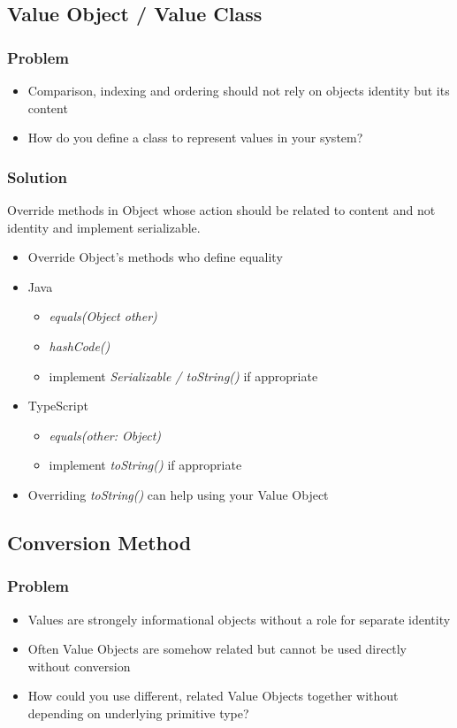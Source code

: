 \subsection{Value Object / Value Class}
\subsubsection{Problem}
\begin{itemize}
    \item Comparison, indexing and ordering should not rely on objects identity but its content
    \item How do you define a class to represent values in your system?
\end{itemize}
\subsubsection{Solution}
Override methods in Object whose action should be related to content and not identity and implement serializable.\\
\begin{itemize}
    \item Override Object's methods who define equality
    \item Java
    \begin{itemize}
        \item \textit{equals(Object other)}
        \item \textit{hashCode()}
        \item implement \textit{Serializable / toString()} if appropriate
    \end{itemize}
    \item TypeScript
    \begin{itemize}
        \item \textit{equals(other: Object)}
        \item implement \textit{toString()} if appropriate
    \end{itemize}
    \item Overriding \textit{toString()} can help using your Value Object
\end{itemize}

\subsection{Conversion Method}
\subsubsection{Problem}
\begin{itemize}
    \item Values are strongely informational objects without a role for separate identity
    \item Often Value Objects are somehow related but cannot be used directly without conversion
    \item How could you use different, related Value Objects together without depending on underlying primitive type?
\end{itemize}
